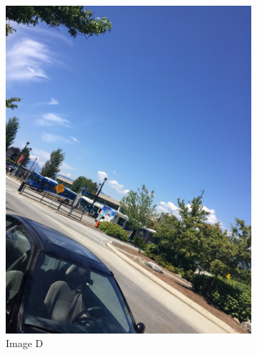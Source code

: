 \documentclass[]{article}
\begin{document}
\begin{figure}[h]
\begin{subfigure}[h]{0.2\textwidth}
		\includegraphics[scale=0.15]{results/4}
		\centering
		\caption{Image D}
	\end{subfigure}%
	\hfill
	\begin{subfigure}[h]{0.2\textwidth}

\end{subfigure}
\end{figure}
\end{document}

